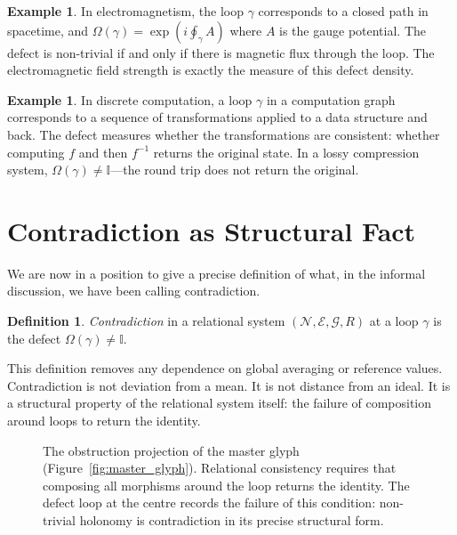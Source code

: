 \documentclass[12pt,a4paper,openany]{book}
\theoremstyle{plain}
\theoremstyle{definition}
\newtheorem{definition}[theorem]{Definition}
\newtheorem{example}[theorem]{Example}
\theoremstyle{remark}
\newcommand{\GG}{\mathcal{G}}
\newcommand{\NN}{\mathcal{N}}
\newcommand{\EE}{\mathcal{E}}
\newcommand{\id}{\mathbb{I}}
\newcommand{\defect}{\Omega}
\begin{document}
\begin{example}
In electromagnetism, the loop $\gamma$ corresponds to a closed path in spacetime, and $\defect(\gamma) = \exp(i \oint_\gamma A)$ where $A$ is the gauge potential. The defect is non-trivial if and only if there is magnetic flux through the loop. The electromagnetic field strength is exactly the measure of this defect density.
\end{example}

\begin{example}
In discrete computation, a loop $\gamma$ in a computation graph corresponds to a sequence of transformations applied to a data structure and back. The defect measures whether the transformations are consistent: whether computing $f$ and then $f^{-1}$ returns the original state. In a lossy compression system, $\defect(\gamma) \neq \id$---the round trip does not return the original.
\end{example}

\section{Contradiction as Structural Fact}

We are now in a position to give a precise definition of what, in the informal discussion, we have been calling contradiction.

\begin{definition}
\emph{Contradiction} in a relational system $(\NN, \EE, \GG, R)$ at a loop $\gamma$ is the defect $\defect(\gamma) \neq \id$.
\end{definition}

This definition removes any dependence on global averaging or reference values. Contradiction is not deviation from a mean. It is not distance from an ideal. It is a structural property of the relational system itself: the failure of composition around loops to return the identity.

\begin{figure}[h]
\centering
{}
\caption[Obstruction projection, Chapter~4: relational ontology]{The obstruction projection of the master glyph (Figure~\ref{fig:master_glyph}). Relational consistency requires that composing all morphisms around the loop returns the identity. The defect loop at the centre records the failure of this condition: non-trivial holonomy is contradiction in its precise structural form.}
\label{fig:glyph_holonomy}
\end{figure}
\end{document}
